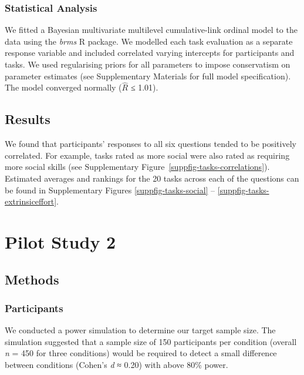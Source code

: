\documentclass[
  man,
  floatsintext,
  longtable,
  nolmodern,
  notxfonts,
  notimes,
  colorlinks=true,linkcolor=blue,citecolor=blue,urlcolor=blue]{apa7}
\begin{document}
\subsubsection*{Statistical Analysis}\label{statistical-analysis-5}

We fitted a Bayesian multivariate multilevel cumulative-link ordinal
model to the data using the \emph{brms} R package. We modelled each task
evaluation as a separate response variable and included correlated
varying intercepts for participants and tasks. We used regularising
priors for all parameters to impose conservatism on parameter estimates
(see Supplementary Materials for full model specification). The model
converged normally (\(\hat{R}\) ≤ 1.01).

\subsection*{Results}\label{results-5}

We found that participants' responses to all six questions tended to be
positively correlated. For example, tasks rated as more social were also
rated as requiring more social skills (see
Supplementary Figure~\ref{suppfig-tasks-correlations}). Estimated
averages and rankings for the 20 tasks across each of the questions can
be found in Supplementary Figures \ref{suppfig-tasks-social} --
\ref{suppfig-tasks-extrinsiceffort}.

\newpage

\section{Pilot Study 2}\label{pilot-study-2}

\subsection*{Methods}\label{methods-6}

\subsubsection*{Participants}\label{participants-6}

We conducted a power simulation to determine our target sample size. The
simulation suggested that a sample size of 150 participants per
condition (overall \emph{n} = 450 for three conditions) would be
required to detect a small difference between conditions (Cohen's
\emph{d} ≈ 0.20) with above 80\% power.
\end{document}
